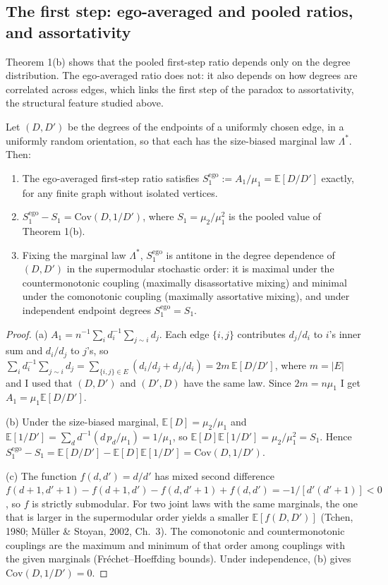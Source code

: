 \documentclass{nws}
\begin{document}
\subsection{The first step: ego-averaged and pooled ratios, and assortativity}

Theorem 1(b) shows that the pooled first-step ratio depends
only on the degree distribution. The ego-averaged ratio does not: it also
depends on how degrees are correlated across edges, which links the first step of the paradox to assortativity, the structural feature studied above.

\begin{proposition}
Let $(D,D')$ be the degrees of the endpoints of a uniformly chosen edge, in a
uniformly random orientation, so that each has the size-biased marginal law
$\Lambda^*$. Then:
\begin{enumerate}
\item[(a)] The ego-averaged first-step ratio satisfies
$S_1^{\mathrm{ego}}:=A_1/\mu_1=\mathbb{E}[D/D']$ exactly, for any finite graph
without isolated vertices.
\item[(b)] $S_1^{\mathrm{ego}}-S_1=\mathrm{Cov}(D,1/D')$, where $S_1=\mu_2/\mu_1^2$
is the pooled value of Theorem 1(b).
\item[(c)] Fixing the marginal law $\Lambda^*$, $S_1^{\mathrm{ego}}$ is
antitone in the degree dependence of $(D,D')$ in the supermodular stochastic
order: it is maximal under the countermonotonic coupling (maximally
disassortative mixing) and minimal under the comonotonic coupling (maximally
assortative mixing), and under independent endpoint degrees
$S_1^{\mathrm{ego}}=S_1$.
\end{enumerate}
\end{proposition}

\begin{proof}
(a) $A_1=n^{-1}\sum_i d_i^{-1}\sum_{j\sim i}d_j$. Each edge $\{i,j\}$
contributes $d_j/d_i$ to $i$'s inner sum and $d_i/d_j$ to $j$'s, so
$\sum_i d_i^{-1}\sum_{j\sim i}d_j=\sum_{\{i,j\}\in E}(d_i/d_j+d_j/d_i)=2m\,
\mathbb{E}[D/D']$, where $m=|E|$ and I used that $(D,D')$ and $(D',D)$ have the same law.
Since $2m=n\mu_1$ I get $A_1=\mu_1\mathbb{E}[D/D']$.

(b) Under the size-biased marginal, $\mathbb{E}[D]=\mu_2/\mu_1$ and
$\mathbb{E}[1/D']=\sum_d d^{-1}(d\,p_d/\mu_1)=1/\mu_1$, so
$\mathbb{E}[D]\mathbb{E}[1/D']=\mu_2/\mu_1^2=S_1$. Hence
$S_1^{\mathrm{ego}}-S_1=\mathbb{E}[D/D']-\mathbb{E}[D]\mathbb{E}[1/D']=
\mathrm{Cov}(D,1/D')$.

(c) The function $f(d,d')=d/d'$ has mixed second difference
$f(d{+}1,d'{+}1)-f(d{+}1,d')-f(d,d'{+}1)+f(d,d')=-1/[d'(d'{+}1)]<0$, so $f$ is
strictly submodular. For two joint laws with the same marginals, the one that is
larger in the supermodular order yields a smaller $\mathbb{E}[f(D,D')]$ (Tchen,
1980; M\"uller \& Stoyan, 2002, Ch.~3). The comonotonic and countermonotonic
couplings are the maximum and minimum of that order among couplings with the
given marginals (Fr\'echet--Hoeffding bounds). Under independence, (b) gives
$\mathrm{Cov}(D,1/D')=0$.
\end{proof}
\end{document}
